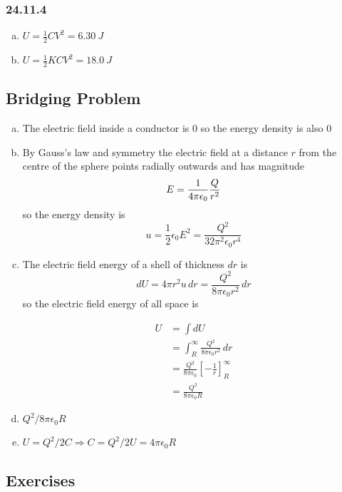 \documentclass{article}
\begin{document}
\subsubsection{24.11.4}

\begin{enumerate}[(a)]
  \item $U = \frac{1}{2} C V^2 = \qty{6.30}{J}$

  \item $U = \frac{1}{2} K C V^2 = \qty{18.0}{J}$
\end{enumerate}

\subsection{Bridging Problem}

\begin{enumerate}[(a)]
  \item The electric field inside a conductor is $0$ so the energy density is also $0$

  \item By Gauss's law and symmetry the electric field at a distance $r$ from the centre of the sphere points radially outwards and has magnitude \[E = \frac{1}{4 \pi \epsilon_0} \frac{Q}{r^2}\] so the energy density is \[u = \frac{1}{2} \epsilon_0 E^2 = \frac{Q^2}{32 \pi^2 \epsilon_0 r^4}\]

  \item The electric field energy of a shell of thickness $dr$ is \[dU = 4 \pi r^2 u \,dr = \frac{Q^2}{8 \pi \epsilon_0 r^2} \,dr\] so the electric field energy of all space is

        \begin{align*}
          U & = \int dU                                                           \\
            & = \int_R^\infty \frac{Q^2}{8 \pi \epsilon_0 r^2} \,dr               \\
            & = \frac{Q^2}{8 \pi \epsilon_0} \left[ -\frac{1}{r} \right]_R^\infty \\
            & = \frac{Q^2}{8 \pi \epsilon_0 R}
        \end{align*}

  \item $Q^2 / 8 \pi \epsilon_0 R$

  \item $U = Q^2 / 2C \Rightarrow C = Q^2 / 2 U = 4 \pi \epsilon_0 R$
\end{enumerate}

\subsection{Exercises}
\end{document}
